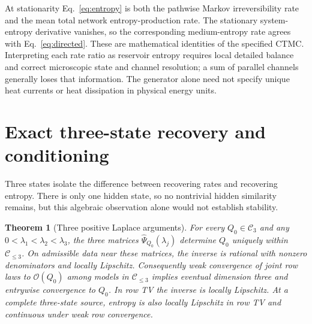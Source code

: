 \documentclass[aps,pre,onecolumn,11pt,longbibliography,notitlepage]{revtex4-2}
\newtheorem{theorem}{Theorem}
\newcommand{\1}{\mathbf 1}
\newcommand{\C}{\mathcal C}
\newcommand{\Obs}{\mathcal O}
\begin{document}
At stationarity Eq.~\eqref{eq:entropy} is both the pathwise Markov irreversibility rate and the mean total network entropy-production rate. The stationary system-entropy derivative vanishes, so the corresponding medium-entropy rate agrees with Eq.~\eqref{eq:directed}. These are mathematical identities of the specified CTMC. Interpreting each rate ratio as reservoir entropy requires local detailed balance and correct microscopic state and channel resolution; a sum of parallel channels generally loses that information. The generator alone need not specify unique heat currents or heat dissipation in physical energy units.

\section{Exact three-state recovery and conditioning}\label{sec:three}
Three states isolate the difference between recovering rates and recovering entropy. There is only one hidden state, so no nontrivial hidden similarity remains, but this algebraic observation alone would not establish stability.

\begin{theorem}[Three positive Laplace arguments]\label{thm:inverse}
For every $Q_0\in\C_3$ and any $0<\lambda_1<\lambda_2<\lambda_3$, the three matrices $\widehat\Psi_{Q_0}(\lambda_j)$ determine $Q_0$ uniquely within $\C_{\le3}$. On admissible data near these matrices, the inverse is rational with nonzero denominators and locally Lipschitz. Consequently weak convergence of joint row laws to $\Obs(Q_0)$ among models in $\C_{\le3}$ implies eventual dimension three and entrywise convergence to $Q_0$. In row TV the inverse is locally Lipschitz. At a complete three-state source, entropy is also locally Lipschitz in row TV and continuous under weak row convergence.
\end{theorem}
\end{document}
